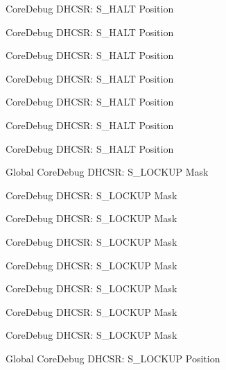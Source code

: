 \begin{DoxyRefList}
\label{deprecated__deprecated000171}%
%
Core\+Debug DHCSR\+: S\+\_\+\+HALT Position 

\label{deprecated__deprecated000256}%
%
Core\+Debug DHCSR\+: S\+\_\+\+HALT Position 

\label{deprecated__deprecated000476}%
%
Core\+Debug DHCSR\+: S\+\_\+\+HALT Position 

\label{deprecated__deprecated000389}%
%
Core\+Debug DHCSR\+: S\+\_\+\+HALT Position 

\label{deprecated__deprecated000578}%
%
Core\+Debug DHCSR\+: S\+\_\+\+HALT Position 

\label{deprecated__deprecated000025}%
%
Core\+Debug DHCSR\+: S\+\_\+\+HALT Position 

\label{deprecated__deprecated000117}%
%
Core\+Debug DHCSR\+: S\+\_\+\+HALT Position  
\item[Global \doxylink{group___c_m_s_i_s___core_debug_ga7b67e4506d7f464ef5dafd6219739756}{Core\+Debug\+\_\+\+DHCSR\+\_\+\+S\+\_\+\+LOCKUP\+\_\+\+Msk} ]\label{deprecated__deprecated000168}%
%
Core\+Debug DHCSR\+: S\+\_\+\+LOCKUP Mask 

\label{deprecated__deprecated000253}%
%
Core\+Debug DHCSR\+: S\+\_\+\+LOCKUP Mask 

\label{deprecated__deprecated000310}%
%
Core\+Debug DHCSR\+: S\+\_\+\+LOCKUP Mask 

\label{deprecated__deprecated000386}%
%
Core\+Debug DHCSR\+: S\+\_\+\+LOCKUP Mask 

\label{deprecated__deprecated000473}%
%
Core\+Debug DHCSR\+: S\+\_\+\+LOCKUP Mask 

\label{deprecated__deprecated000022}%
%
Core\+Debug DHCSR\+: S\+\_\+\+LOCKUP Mask 

\label{deprecated__deprecated000114}%
%
Core\+Debug DHCSR\+: S\+\_\+\+LOCKUP Mask 

\label{deprecated__deprecated000575}%
%
Core\+Debug DHCSR\+: S\+\_\+\+LOCKUP Mask  
\item[Global \doxylink{group___c_m_s_i_s___core_debug_ga2900dd56a988a4ed27ad664d5642807e}{Core\+Debug\+\_\+\+DHCSR\+\_\+\+S\+\_\+\+LOCKUP\+\_\+\+Pos} ]\label{deprecated__deprecated000385}%
%
Core\+Debug DHCSR\+: S\+\_\+\+LOCKUP Position 


\end{DoxyRefList}
